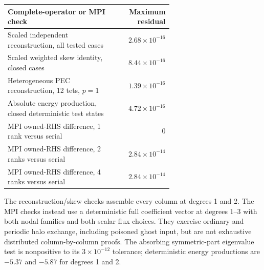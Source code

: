 \begin{center}
\begin{tabular}{p{0.64\linewidth}r}
\toprule
Complete-operator or MPI check & Maximum residual\\\midrule
Scaled independent reconstruction, all tested cases & \(2.68\times10^{-16}\)\\
Scaled weighted skew identity, closed cases & \(8.44\times10^{-16}\)\\
Heterogeneous PEC reconstruction, 12 tets, \(p=1\) & \(1.39\times10^{-16}\)\\
Absolute energy production, closed deterministic test states & \(4.72\times10^{-16}\)\\
MPI owned-RHS difference, 1 rank versus serial & \(0\)\\
MPI owned-RHS difference, 2 ranks versus serial & \(2.84\times10^{-14}\)\\
MPI owned-RHS difference, 4 ranks versus serial & \(2.84\times10^{-14}\)\\
\bottomrule
\end{tabular}
\end{center}
The reconstruction/skew checks assemble every column at degrees 1 and 2.
The MPI checks instead use a deterministic full coefficient vector at
degrees 1--3 with both nodal families and both scalar flux choices. They
exercise ordinary and periodic halo exchange, including poisoned ghost
input, but are not exhaustive distributed column-by-column proofs.
The absorbing symmetric-part eigenvalue test is nonpositive to its
\(3\times10^{-12}\) tolerance; deterministic energy productions are
\(-5.37\) and \(-5.87\) for degrees 1 and 2.

